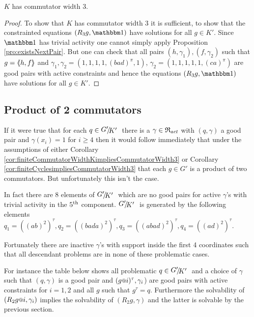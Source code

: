\documentclass[a4paper,12pt]{article}
\begin{document}
\begin{cor}
 $K$ has commutator width $3$. 
\end{cor}
\begin{proof}
 To show that $K$ has commutator width $3$ it is sufficient, to show that the constrainted equations $(R_3g,\id)$ have solutions for all $g\in K'$. 
 Since $\id$ has trivial activity one cannot simply apply Proposition \ref{pro:existsNextPair}.
 But one can check that all pairs $(h,\gamma_1),(f,\gamma_2)$ such that $g=\langle\negthickspace\langle h,f\rangle\negthickspace\rangle$ and $\gamma_1,\gamma_2=(1,1,1,1,(bad)^\pi,1)$, $\gamma_2=(1,1,1,1,1,(ca)^\pi)$
 are good pairs with active constraints and hence the equations $(R_3g,\id)$ have solutions for all $g\in K'$. 
\end{proof}


\subsection{Product of 2 commutators}
If it were true that for each $q\in\RNK{G'}{K'}$ there is a $\gamma\in\mathfrak{R}_{act}$ with $(q,\gamma)$ a good pair and $\gamma(x_i)=1$ for $i\geq 4$
then it would follow immediately that under the assumptions of either Corollary \ref{cor:finiteCommutatorWidthKimpliesCommutatorWidth3}
or Corollary \ref{cor:finiteCyclesimpliesCommutatorWidth3} that each $g\in G'$ is a product of two commutators. But unfortunately 
this isn't the case.

In fact there are $8$ elements of $\RNK{G'}{K'}$ which are no good pairs for active $\gamma$'s with trivial activity in the $5^\textup{th}$ component.
$\RNK{G'}{K'}$ is generated by the following elements $q_1 = ((ab)^2)^\tau,q_2 = ((bada)^2)^\tau,q_3 = ((abad)^2)^\tau,q_4 = ((ad)^2)^\tau$. 

Fortunately there are inactive $\gamma$'s with support inside the first 4 coordinates such that 
all descendant problems are in none of these problematic cases. 

For instance the table below shows 
all problematic $q\in \RNK{G'}{K'}$ and a choice of $\gamma$ such that $(q,\gamma)$ is a good pair
and $(g\at{i})^\tau,\gamma_i$) are good pairs with active constraints for $i=1,2$ and all $g$ such that $g^\tau = q$. 
Furthermore the solvability of $(R_2g\at{i},\gamma_i)$ implies the solvability of $(R_2g,\gamma)$ and the latter is solvable by 
the previous section.
\end{document}
